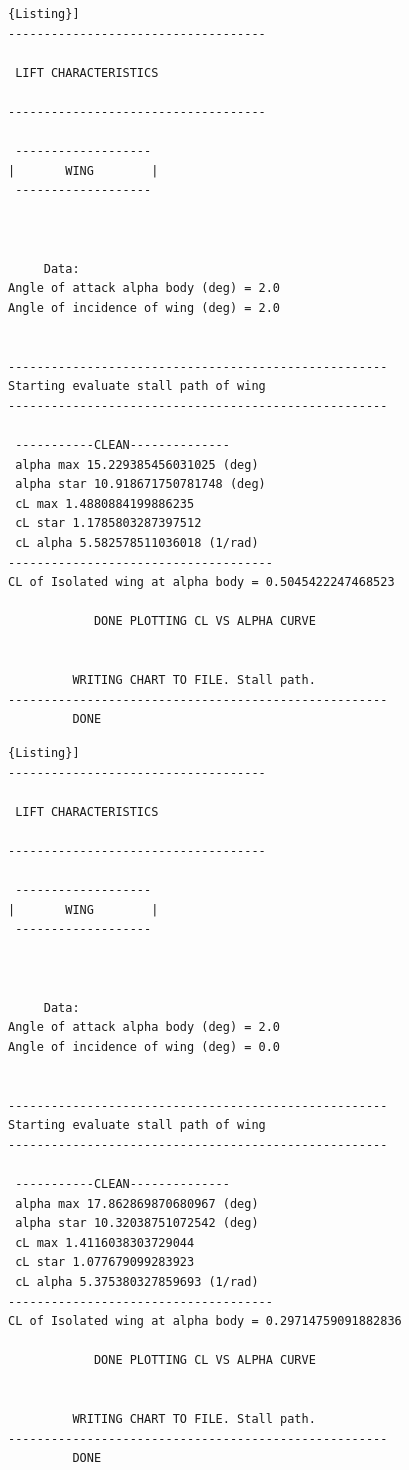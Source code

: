 \begin{lstlisting}[caption={{\footnotesize Lift Characteristics of a Lifting Surface - Results. ATR-72}},label= [style=\bfseries]{Listing}]
------------------------------------

 LIFT CHARACTERISTICS  

------------------------------------

 ------------------- 
|       WING        |
 ------------------- 



 	 Data: 
Angle of attack alpha body (deg) = 2.0
Angle of incidence of wing (deg) = 2.0

 
-----------------------------------------------------
Starting evaluate stall path of wing
-----------------------------------------------------

 -----------CLEAN-------------- 
 alpha max 15.229385456031025 (deg)
 alpha star 10.918671750781748 (deg)
 cL max 1.4880884199886235
 cL star 1.1785803287397512
 cL alpha 5.582578511036018 (1/rad)
-------------------------------------
CL of Isolated wing at alpha body = 0.5045422247468523

 	 	 	DONE PLOTTING CL VS ALPHA CURVE  

 
 	 	 WRITING CHART TO FILE. Stall path. 
-----------------------------------------------------
	 	 DONE 
\end{lstlisting}


\begin{lstlisting}[caption={{\footnotesize Lift Characteristics of a Lifting Surface - Results. BOEING 747-100B}},label= [style=\bfseries]{Listing}]
------------------------------------

 LIFT CHARACTERISTICS  

------------------------------------

 ------------------- 
|       WING        |
 ------------------- 



 	 Data: 
Angle of attack alpha body (deg) = 2.0
Angle of incidence of wing (deg) = 0.0

 
-----------------------------------------------------
Starting evaluate stall path of wing
-----------------------------------------------------

 -----------CLEAN-------------- 
 alpha max 17.862869870680967 (deg)
 alpha star 10.32038751072542 (deg)
 cL max 1.4116038303729044
 cL star 1.077679099283923
 cL alpha 5.375380327859693 (1/rad)
-------------------------------------
CL of Isolated wing at alpha body = 0.29714759091882836

 	 	 	DONE PLOTTING CL VS ALPHA CURVE  

 
 	 	 WRITING CHART TO FILE. Stall path. 
-----------------------------------------------------
	 	 DONE 
\end{lstlisting}

